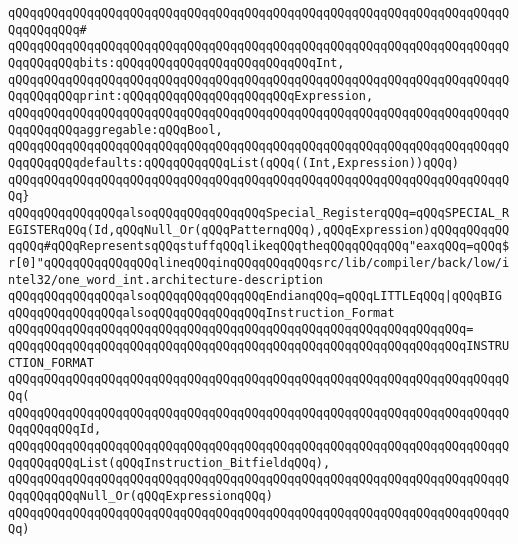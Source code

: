 \verb|qQQqqQQqqQQqqQQqqQQqqQQqqQQqqQQqqQQqqQQqqQQqqQQqqQQqqQQqqQQqqQQqqQQqqQQqqQQqqQQq#|\newline
\verb|qQQqqQQqqQQqqQQqqQQqqQQqqQQqqQQqqQQqqQQqqQQqqQQqqQQqqQQqqQQqqQQqqQQqqQQqqQQqqQQqbits:qQQqqQQqqQQqqQQqqQQqqQQqqQQqInt,|\newline
\verb|qQQqqQQqqQQqqQQqqQQqqQQqqQQqqQQqqQQqqQQqqQQqqQQqqQQqqQQqqQQqqQQqqQQqqQQqqQQqqQQqprint:qQQqqQQqqQQqqQQqqQQqqQQqExpression,|\newline
\verb|qQQqqQQqqQQqqQQqqQQqqQQqqQQqqQQqqQQqqQQqqQQqqQQqqQQqqQQqqQQqqQQqqQQqqQQqqQQqqQQqaggregable:qQQqBool,|\newline
\verb|qQQqqQQqqQQqqQQqqQQqqQQqqQQqqQQqqQQqqQQqqQQqqQQqqQQqqQQqqQQqqQQqqQQqqQQqqQQqqQQqdefaults:qQQqqQQqqQQqList(qQQq((Int,Expression))qQQq)|\newline
\verb|qQQqqQQqqQQqqQQqqQQqqQQqqQQqqQQqqQQqqQQqqQQqqQQqqQQqqQQqqQQqqQQqqQQqqQQq}|\newline
\newline
\verb|qQQqqQQqqQQqqQQqalsoqQQqqQQqqQQqqQQqSpecial_RegisterqQQq=qQQqSPECIAL_REGISTERqQQq(Id,qQQqNull_Or(qQQqPatternqQQq),qQQqExpression)qQQqqQQqqQQqqQQq#qQQqRepresentsqQQqstuffqQQqlikeqQQqtheqQQqqQQqqQQq"eaxqQQq=qQQq$r[0]"qQQqqQQqqQQqqQQqlineqQQqinqQQqqQQqqQQqsrc/lib/compiler/back/low/intel32/one_word_int.architecture-description|\newline
\newline
\verb|qQQqqQQqqQQqqQQqalsoqQQqqQQqqQQqqQQqEndianqQQq=qQQqLITTLEqQQq|\verb#|qQQqBIG#\newline
\newline
\verb|qQQqqQQqqQQqqQQqalsoqQQqqQQqqQQqqQQqInstruction_Format|\newline
\verb|qQQqqQQqqQQqqQQqqQQqqQQqqQQqqQQqqQQqqQQqqQQqqQQqqQQqqQQqqQQqqQQq=|\newline
\verb|qQQqqQQqqQQqqQQqqQQqqQQqqQQqqQQqqQQqqQQqqQQqqQQqqQQqqQQqqQQqqQQqINSTRUCTION_FORMAT|\newline
\verb|qQQqqQQqqQQqqQQqqQQqqQQqqQQqqQQqqQQqqQQqqQQqqQQqqQQqqQQqqQQqqQQqqQQqqQQq(|\newline
\verb|qQQqqQQqqQQqqQQqqQQqqQQqqQQqqQQqqQQqqQQqqQQqqQQqqQQqqQQqqQQqqQQqqQQqqQQqqQQqqQQqId,|\newline
\verb|qQQqqQQqqQQqqQQqqQQqqQQqqQQqqQQqqQQqqQQqqQQqqQQqqQQqqQQqqQQqqQQqqQQqqQQqqQQqqQQqList(qQQqInstruction_BitfieldqQQq),|\newline
\verb|qQQqqQQqqQQqqQQqqQQqqQQqqQQqqQQqqQQqqQQqqQQqqQQqqQQqqQQqqQQqqQQqqQQqqQQqqQQqqQQqNull_Or(qQQqExpressionqQQq)|\newline
\verb|qQQqqQQqqQQqqQQqqQQqqQQqqQQqqQQqqQQqqQQqqQQqqQQqqQQqqQQqqQQqqQQqqQQqqQQq)|\newline
